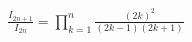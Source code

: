 \documentclass[preview]{standalone}
\begin{document}
\begin{align*}
\frac{I_{2n+1}}{I_{2n}} = \prod_{k=1}^{n} \frac{(2k)^2}{(2k-1)(2k+1)}
\end{align*}
\end{document}
